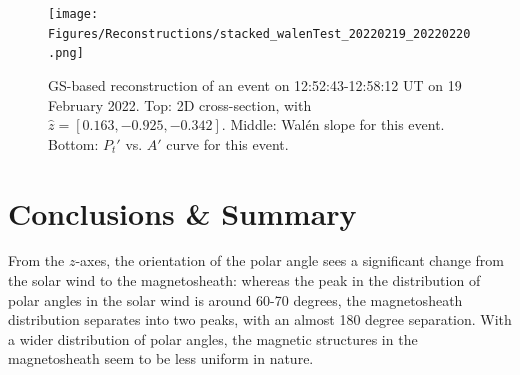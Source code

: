 

\begin{figure}
    \centering
    \texttt{[image: Figures/Reconstructions/stacked\_walenTest\_20220219\_20220220.png]}
    \caption[GS-based event reconstruction for 19 February 2022]{GS-based reconstruction of an event on 12:52:43-12:58:12 UT on 19 February 2022. Top: 2D cross-section, with $\hat{z}=[0.163,-0.925,-0.342]$. Middle: Wal\'en slope for this event. Bottom: $P_t'$ vs. $A'$ curve for this event.}
    \label{fig:reconstruction-Feb2022}
\end{figure}



\section{Conclusions \& Summary}
From the $z$-axes, the orientation of the polar angle sees a significant change from the solar wind to the magnetosheath: whereas the peak in the distribution of polar angles in the solar wind is around 60-70 degrees, the magnetosheath distribution separates into two peaks, with an almost 180 degree separation. With a wider distribution of polar angles, the magnetic structures in the magnetosheath seem to be less uniform in nature.

